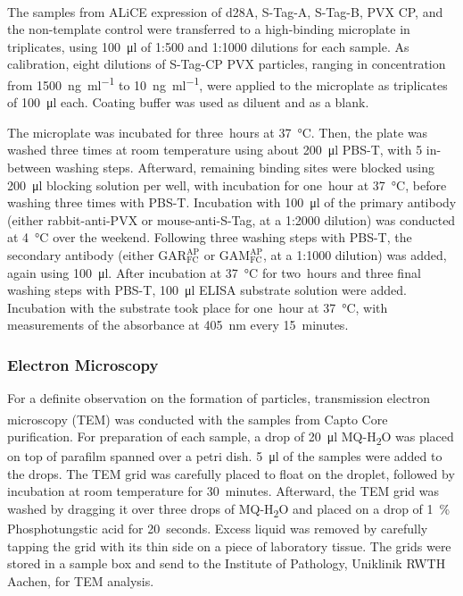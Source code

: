 The samples from ALiCE\textsuperscript{\textregistered} expression of d28A, S-Tag-A, S-Tag-B, PVX CP, and the non-template control were transferred to a high-binding microplate in triplicates, using \SI{100}{\micro\litre} of 1:500 and 1:1000 dilutions for each sample. As calibration, eight dilutions of S-Tag-CP PVX particles, ranging in concentration from \SI{1500}{\nano\gram\per\milli\litre} to \SI{10}{\nano\gram\per\milli\litre}, were applied to the microplate as triplicates of \SI{100}{\micro\litre} each. Coating buffer was used as diluent and as a blank. 

The microplate was incubated for three~hours at \SI{37}{\degreeCelsius}. Then, the plate was washed three times at room temperature using about \SI{200}{\micro\litre} PBS-T, with \SI{5}{\min} in-between washing steps. Afterward, remaining binding sites were blocked using \SI{200}{\micro\litre} blocking solution per well, with incubation for one~hour at \SI{37}{\degreeCelsius}, before washing three times with PBS-T. Incubation with \SI{100}{\micro\litre} of the primary antibody (either rabbit-anti-PVX or mouse-anti-S-Tag, at a 1:2000 dilution) was conducted at \SI{4}{\degreeCelsius} over the weekend. Following three washing steps with PBS-T, the secondary antibody (either $\mathrm{GAR}_{\mathrm{FC}}^{\mathrm{AP}}$ or $\mathrm{GAM}_{\mathrm{FC}}^{\mathrm{AP}}$, at a 1:1000 dilution) was added, again using \SI{100}{\micro\litre}. After incubation at \SI{37}{\degreeCelsius} for two~hours and three final washing steps with PBS-T, \SI{100}{\micro\litre} ELISA substrate solution were added. Incubation with the substrate took place for one~hour at \SI{37}{\degreeCelsius}, with measurements of the absorbance at \SI{405}{\nano\meter} every 15~minutes. 


\subsubsection{Electron Microscopy}
For a definite observation on the formation of particles, transmission electron microscopy (TEM) was conducted with the samples from Capto\textsuperscript{\texttrademark} Core purification. For preparation of each sample, a drop of \SI{20}{\micro\litre} MQ-H\textsubscript{2}O was placed on top of parafilm spanned over a petri dish. \SI{5}{\micro\litre} of the samples were added to the drops. The TEM grid was carefully placed to float on the droplet, followed by incubation at room temperature for 30~minutes. Afterward, the TEM grid was washed by dragging it over three drops of MQ-H\textsubscript{2}O and placed on a drop of \SI{1}{\percent} Phosphotungstic acid for 20~seconds. Excess liquid was removed by carefully tapping the grid with its thin side on a piece of laboratory tissue. The grids were stored in a sample box and send to the Institute of Pathology, Uniklinik RWTH Aachen, for TEM analysis. 